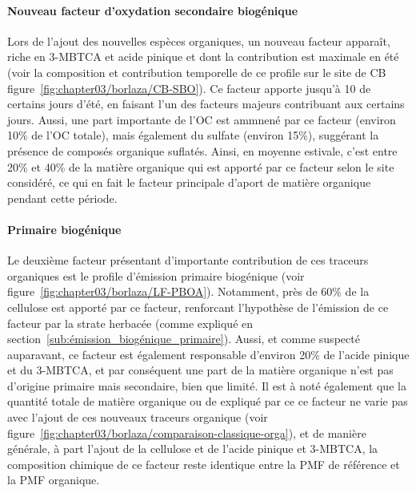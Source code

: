 \paragraph{Nouveau facteur d'oxydation secondaire biogénique}%
\label{par:nouveau_facteur_d_oxydation_secondaire_biogénique}

Lors de l'ajout des nouvelles espèces organiques, un nouveau facteur apparaît, riche en
3-MBTCA et acide pinique et dont la contribution est maximale en été (voir la composition
et contribution temporelle de ce profile sur le site de CB
figure~\ref{fig:chapter03/borlaza/CB-SBO}).
Ce facteur apporte jusqu'à \SI{10}{\ugm} de \PMdix{} certains jours d'été, en faisant l'un
des facteurs majeurs contribuant aux \PMdix{} certains jours.
Aussi, une part importante de l'OC est ammnené par ce facteur (environ 10\% de l'OC
totale), mais également du sulfate (environ 15\%), suggérant la présence de composés
organique suflatés.
Ainsi, en moyenne estivale, c'est entre 20\% et 40\% de la matière organique qui est
apporté par ce facteur selon le site considéré, ce qui en fait le facteur principale
d'aport de matière organique pendant cette période.

\paragraph{Primaire biogénique}%
\label{par:primaire_biogénique}

Le deuxième facteur présentant d'importante contribution de ces traceurs organiques est
le profile d'émission primaire biogénique (voir
figure~\ref{fig:chapter03/borlaza/LF-PBOA}). Notamment, près de 60\% de la cellulose est
apporté par ce facteur, renforcant l'hypothèse de l'émission de ce facteur par la strate
herbacée (comme expliqué en section~\ref{sub:émission_biogénique_primaire}). Aussi, et
comme suspecté auparavant, ce facteur est également responsable d'environ 20\% de l'acide
pinique et du 3-MBTCA, et par conséquent une part de la matière organique n'est pas
d'origine primaire mais secondaire, bien que limité. Il est à noté également que la
quantité totale de matière organique ou de \PMdix{} expliqué par ce ce facteur ne varie
pas avec l'ajout de ces nouveaux traceurs organique (voir
figure~\ref{fig:chapter03/borlaza/comparaison-classique-orga}), et de manière générale, à
part l'ajout de la cellulose et de l'acide pinique et 3-MBTCA, la
composition chimique de ce facteur reste identique entre la PMF de référence et la PMF
organique.

